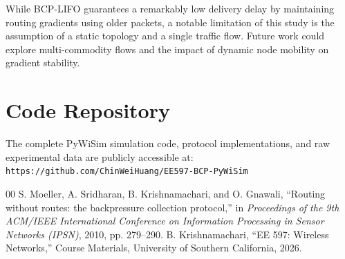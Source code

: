 \documentclass[10pt, twocolumn, letterpaper]{article}
\begin{document}
While BCP-LIFO guarantees a remarkably low delivery delay by maintaining routing gradients using older packets, a notable limitation of this study is the assumption of a static topology and a single traffic flow. Future work could explore multi-commodity flows and the impact of dynamic node mobility on gradient stability.

\section*{Code Repository}
The complete PyWiSim simulation code, protocol implementations, and raw experimental data are publicly accessible at: \texttt{https://github.com/ChinWeiHuang/EE597-BCP-PyWiSim}

\begin{thebibliography}{00}
 S. Moeller, A. Sridharan, B. Krishnamachari, and O. Gnawali, ``Routing without routes: the backpressure collection protocol,'' in \textit{Proceedings of the 9th ACM/IEEE International Conference on Information Processing in Sensor Networks (IPSN)}, 2010, pp. 279--290.
 B. Krishnamachari, ``EE 597: Wireless Networks,'' Course Materials, University of Southern California, 2026.
\end{thebibliography}
\end{document}
